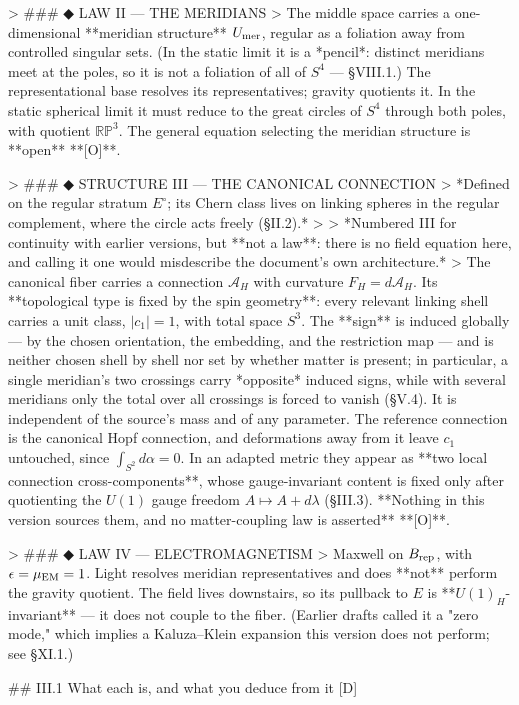 > ### ◆ LAW II — THE MERIDIANS
> The middle space carries a one-dimensional **meridian structure** $U_{\rm mer}$, regular as a foliation away from controlled singular sets. (In the static limit it is a *pencil*: distinct meridians meet at the poles, so it is not a foliation of all of $S^4$ — §VIII.1.) The representational base resolves its representatives; gravity quotients it. In the static spherical limit it must reduce to the great circles of $S^4$ through both poles, with quotient $\mathbb{RP}^3$. The general equation selecting the meridian structure is **open** **[O]**.

> ### ◆ STRUCTURE III — THE CANONICAL CONNECTION
> *Defined on the regular stratum $E^\circ$; its Chern class lives on linking spheres in the regular complement, where the circle acts freely (§II.2).*
>
> *Numbered III for continuity with earlier versions, but **not a law**: there is no field equation here, and calling it one would misdescribe the document's own architecture.*
> The canonical fiber carries a connection $\mathcal{A}_H$ with curvature $F_H = d\mathcal{A}_H$. Its **topological type is fixed by the spin geometry**: every relevant linking shell carries a unit class, $|c_1| = 1$, with total space $S^3$. The **sign** is induced globally — by the chosen orientation, the embedding, and the restriction map — and is neither chosen shell by shell nor set by whether matter is present; in particular, a single meridian's two crossings carry *opposite* induced signs, while with several meridians only the total over all crossings is forced to vanish (§V.4). It is independent of the source's mass and of any parameter. The reference connection is the canonical Hopf connection, and deformations away from it leave $c_1$ untouched, since $\int_{S^2}d\alpha = 0$. In an adapted metric they appear as **two local connection cross-components**, whose gauge-invariant content is fixed only after quotienting the $U(1)$ gauge freedom $A\mapsto A+d\lambda$ (§III.3). **Nothing in this version sources them, and no matter-coupling law is asserted** **[O]**.

> ### ◆ LAW IV — ELECTROMAGNETISM
> Maxwell on $B_{\rm rep}$, with $\epsilon = \mu_{\rm EM} = 1$. Light resolves meridian representatives and does **not** perform the gravity quotient. The field lives downstairs, so its pullback to $E$ is **$U(1)_H$-invariant** — it does not couple to the fiber. (Earlier drafts called it a "zero mode," which implies a Kaluza–Klein expansion this version does not perform; see §XI.1.)

## III.1 What each is, and what you deduce from it [D]

